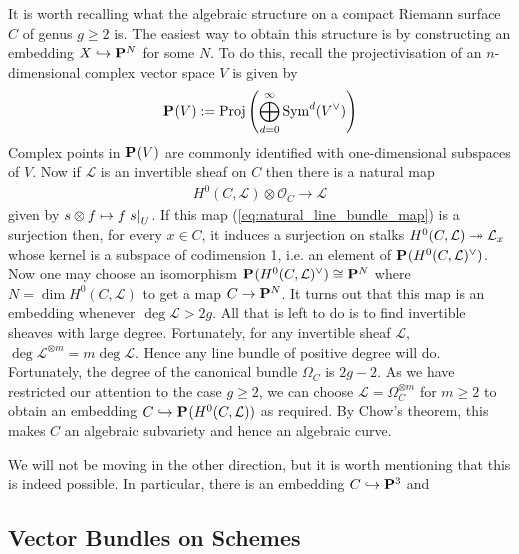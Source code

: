 \documentclass[12pt]{ociamthesis}  %
\begin{document}
It is worth recalling what the algebraic structure on a compact
Riemann surface $C$ of genus $g\geq 2$ is. The easiest way to obtain
this structure is by constructing an embedding
$X\hookrightarrow\mathbf{P}^{N}_{}$ for some $N$. To do this, recall
the projectivisation of an $n$-dimensional complex vector
space $V$ is given by
\begin{align*}
  \mathbf{P}^{}_{}(V) := \operatorname{Proj}\left({
      \bigoplus_{d=0}^\infty \operatorname{Sym}^d(V^\vee)
  }\right)
\end{align*}
Complex points in $\mathbf{P}^{}_{}(V)$ are commonly identified
with one-dimensional subspaces of $V$. Now if $\mathcal L$ is
an invertible sheaf on $C$ then there is a natural map
\begin{align}\label{eq:natural_line_bundle_map}
  H^0(C,\mathcal L)\otimes\mathcal O_C \to \mathcal L
\end{align}
given by $s\otimes f \mapsto f\left.{s}\right\vert_{U}$. If this map
(\ref{eq:natural_line_bundle_map}) is a surjection then,
for every $x\in C$, it induces a surjection on stalks
$H^0(C,\mathcal L) \twoheadrightarrow \mathcal L_x$ whose kernel is a
subspace of codimension 1, i.e. an element of
$\mathbf{P}^{}_{}(H^0(C,\mathcal L)^\vee)$. Now one may choose an
isomorphism $\mathbf{P}^{}_{}(H^0(C,\mathcal L)^\vee)\cong\mathbf{P}^{N}_{}$ where $N = \dim H^0(C,\mathcal L)$ to get a map
$C\to\mathbf{P}^{N}_{}$. It turns out that this map is an embedding
whenever $\deg\mathcal L > 2g$. \cite[Proposition 2.14]{harris2011}
All that is left to do is to find invertible sheaves with large
degree. Fortunately, for any invertible sheaf $\mathcal L$,
$\deg\mathcal L^{\otimes m} = m\deg\mathcal L$. Hence any line
bundle of positive degree will do. Fortunately, the degree of
the canonical bundle $\Omega_C$ is $2g-2$. As we have restricted
our attention to the case $g\geq 2$, we can choose
$\mathcal L = \Omega_C^{\otimes m}$ for $m \geq 2$ to obtain
an embedding $C\hookrightarrow\mathbf{P}^{}_{}(H^0(C,\mathcal L))$ as required.
By Chow's theorem, this makes $C$ an algebraic subvariety
and hence an algebraic curve.

We will not be moving in the other direction, but it is worth
mentioning that this is indeed possible. In particular, there
is an embedding $C\hookrightarrow\mathbf{P}^{3}_{}$ and

\missingsection

\subsection{Vector Bundles on Schemes}
\end{document}
